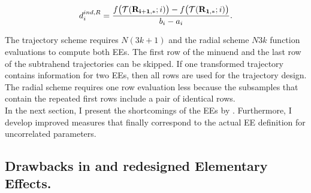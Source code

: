 \begin{align}
d_i^{ind, R} = \frac{f\big(\mathcal{T}(\bold{R_{i+1,*}}; i)\big) - f\big(\mathcal{T}(\bold{R_{1,*}}; i)\big)}{b_i - a_i}.
\end{align}

\noindent
The trajectory scheme requires $N(3k+1)$ and the radial scheme $N3k$ function evaluations to compute both EEs. The first row of the minuend and the last row of the subtrahend trajectories can be skipped. If one transformed trajectory contains information for two EEs, then all rows are used for the trajectory design. The radial scheme requires one row evaluation less because the subsamples that contain the repeated first rows include a pair of identical rows.\\

\noindent
In the next section, I present the shortcomings of the EEs by \cite{ge2017extending}. 
Furthermore, I develop improved measures that finally correspond to the actual EE definition for uncorrelated parameters.


\subsection{Drawbacks in \cite{ge2017extending} and redesigned Elementary Effects.}

